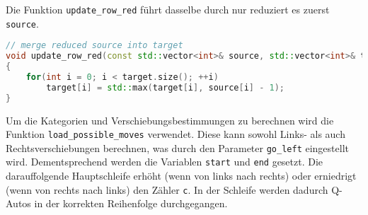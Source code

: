 \documentclass[a4paper,10pt,ngerman]{scrartcl}
\begin{document}
Die Funktion \lstinline{update_row_red} führt dasselbe durch nur reduziert es zuerst \lstinline{source}.
\begin{lstlisting}[language=C++]
// merge reduced source into target
void update_row_red(const std::vector<int>& source, std::vector<int>& target)
{
    for(int i = 0; i < target.size(); ++i)
        target[i] = std::max(target[i], source[i] - 1);
}
\end{lstlisting}

Um die Kategorien und Verschiebungsbestimmungen zu berechnen wird die Funktion \lstinline{load_possible_moves} verwendet.
Diese kann sowohl Links- als auch Rechtsverschiebungen berechnen, was durch den Parameter \lstinline{go_left} eingestellt wird.
Dementsprechend werden die Variablen \lstinline{start} und \lstinline{end} gesetzt.
Die darauffolgende Hauptschleife erhöht (wenn von links nach rechts) oder erniedrigt (wenn von rechts nach links) den Zähler \lstinline{c}.
In der Schleife werden dadurch Q-Autos in der korrekten Reihenfolge durchgegangen.
\end{document}
